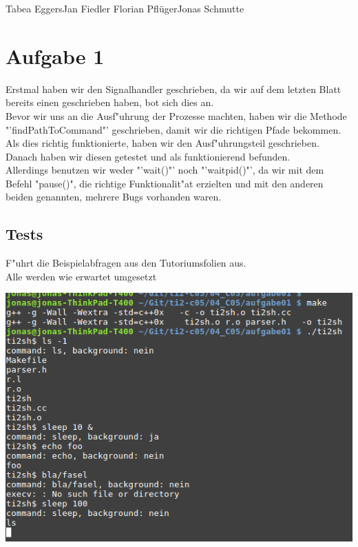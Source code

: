 \documentclass{ti2}
\begin{document}
%
                {Tabea Eggers}{Jan Fiedler}%
                {Florian Pflüger}{Jonas Schmutte}%


\section*{Aufgabe 1}
Erstmal haben wir den Signalhandler geschrieben, da wir auf dem letzten Blatt bereits einen geschrieben haben, bot sich dies an.\\
Bevor wir uns an die Ausf"uhrung der Prozesse machten, haben wir die Methode "'findPathToCommand"' geschrieben, damit wir die richtigen Pfade bekommen.\\
Als dies richtig funktionierte, haben wir den Ausf"uhrungsteil geschrieben.\\
Danach haben wir diesen getestet und als funktionierend befunden.\\
Allerdings benutzen wir weder "'wait()"' noch "'waitpid()"', da wir mit dem Befehl "pause()", die richtige Funktionalit"at erzielten und mit den anderen beiden genannten, mehrere Bugs vorhanden waren.\\





\subsection*{Tests}

F"uhrt die Beispielabfragen aus den Tutoriumsfolien aus.\\
Alle werden wie erwartet umgesetzt\\

\begin{minipage}{\linewidth}
	\centering%
	\includegraphics[width=\textwidth]{aufgabe01/test1.png}
\end{minipage}
\end{document}
